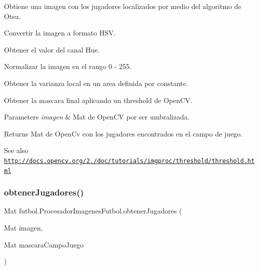 Obtiene una imagen con los jugadores localizados por medio del algoritmo de Otsu.
\begin{DoxyEnumerate}
\item Convertir la imagen a formato H\+SV.
\item Obtener el valor del canal Hue.
\item Normalizar la imagen en el rango 0 -\/ 255.
\item Obtener la varianza local en un area definida por constante.
\item Obtener la mascara final aplicando un threshold de Open\+CV. 
\begin{DoxyParams}{Parameters}
{\em imagen} & Mat de Open\+CV por ser umbralizada. \\
\hline
\end{DoxyParams}
\begin{DoxyReturn}{Returns}
Mat de Open\+Cv con los jugadores encontrados en el campo de juego. 
\end{DoxyReturn}
\begin{DoxySeeAlso}{See also}
\href{http://docs.opencv.org/2.4/doc/tutorials/imgproc/threshold/threshold.html}{\tt http\+://docs.\+opencv.\+org/2./doc/tutorials/imgproc/threshold/threshold.\+html} 
\end{DoxySeeAlso}

\end{DoxyEnumerate}\hypertarget{classfutbol_1_1_procesador_imagenes_futbol_ac35e82c234b3a1608072910df609c6f5}{}\label{classfutbol_1_1_procesador_imagenes_futbol_ac35e82c234b3a1608072910df609c6f5} 
\subsubsection{\texorpdfstring{obtener\+Jugadores()}{obtenerJugadores()}}
{\footnotesize\ttfamily Mat futbol.\+Procesador\+Imagenes\+Futbol.\+obtener\+Jugadores (\begin{DoxyParamCaption}\item[{Mat}]{imagen,  }\item[{Mat}]{mascara\+Campo\+Juego }\end{DoxyParamCaption})\hspace{0.3cm}{\ttfamily [private]}}

